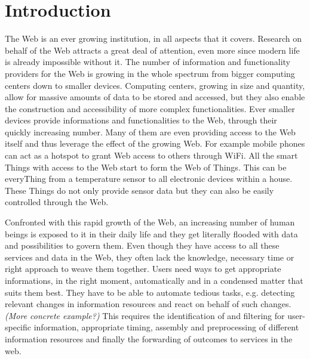 
\chapter{Introduction}


The Web is an ever growing institution, in all aspects that it covers.
Research on behalf of the Web attracts a great deal of attention, even more since modern life is already impossible without it.
The number of information and functionality providers for the Web is growing in the whole spectrum from bigger computing centers down to smaller devices.
Computing centers, growing in size and quantity, allow for massive amounts of data to be stored and accessed, but they also enable the construction and accessibility of more complex functionalities.
Ever smaller devices provide informations and functionalities to the Web, through their quickly increasing number.
Many of them are even providing access to the Web itself and thus leverage the effect of the growing Web.
For example mobile phones can act as a hotspot to grant Web access to others through \textrm{WiFi}.
All the smart \textrm{Things} with access to the Web start to form the \textrm{Web of Things}.
This can be every\textrm{Thing} from a temperature sensor to all electronic devices within a house.
These \textrm{Things} do not only provide sensor data but they can also be easily controlled through the Web.

Confronted with this rapid growth of the Web, an increasing number of human beings is exposed to it in their daily life and they get literally flooded with data and possibilities to govern them.
Even though they have access to all these services and data in the Web, they often lack the knowledge, necessary time or right approach to weave them together.
Users need ways to get appropriate informations, in the right moment, automatically and in a condensed matter that suits them best.
They have to be able to automate tedious tasks, e.g. detecting relevant changes in information resources and react on behalf of such changes.
\textit{\small{(More concrete example?)}}
This requires the identification of and filtering for user-specific information, appropriate timing, assembly and preprocessing of different information resources and finally the forwarding of outcomes to services in the web. 

